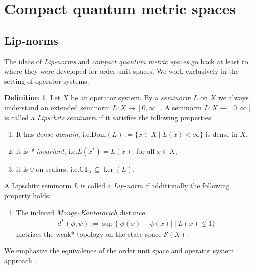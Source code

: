 \documentclass{amsart}
\theoremstyle{plain}
\theoremstyle{definition}
\newtheorem{definition}[theorem]{Definition}
\theoremstyle{remark}
\begin{document}
	\section{Compact quantum metric spaces}\label{sec:CQMS}
	
	\subsection{Lip-norms}
	
	The ideas of \emph{Lip-norms} and \emph{compact quantum metric spaces} go back at least to \cite{Rie98, Rie99, Rie04} where they were developed for order unit spaces.
	We work exclusively in the setting of operator systems.
	
	\begin{definition}
		Let $X$ be an operator system.
		By a \emph{seminorm} $L$ on $X$ we always understand an extended seminorm $L : X \rightarrow [0,\infty]$.
		A seminorm $L : X \rightarrow [0,\infty]$ is called a \emph{Lipschitz seminorm} if it satisfies the following properties:
		\begin{enumerate}
			\item It has \emph{dense domain}, i.e.\@ $\mathrm{Dom}(L) := \{x \in X \mid L(x) < \infty\}$ is dense in $X$,
			\item it is \emph{*-invariant}, i.e.\@ $L(x^*) = L(x)$, for all $x \in X$,
			\item it is $0$ on scalars, i.e.\@ $\mathbb{C}\mathbf{1}_X \subseteq \ker(L)$.
			\setcounter{counter}{\value{enumi}}
		\end{enumerate}
		A Lipschitz seminorm $L$ is called a \emph{Lip-norm} if additionally the following property holds:
		\begin{enumerate}
			\setcounter{enumi}{\value{counter}}
			\item The induced \emph{Monge--Kantorovich} distance 
			\begin{align}
				d^{L}(\phi,\psi) := \sup \{|\phi(x)-\psi(x)| \mid L(x) \leq 1\}
			\end{align}
			metrizes the weak* topology on the state space $\mathcal{S}(X)$.
		\end{enumerate}
	\end{definition}
	
	We emphasize the equivalence of the order unit space and operator system approach \cite[Proposition 2.8]{KK22}.
	
\end{document}
